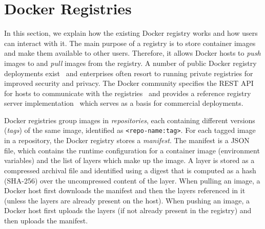 \section{Docker Registries}
\label{sec:background}


%
%

In this section, we explain how the existing Docker registry works and how users
can interact with it.
%
The main purpose of a registry is to store container images and make them available
to other users.
%
Therefore, it allows Docker hosts to \emph{push} images to and \emph{pull}
images from the registry.
%
A number of public Docker registry deployments
exist~\cite{docker-hub,amazon-ecr,jfrog-artifactory,azure-cr,google-cr} and
enterprises often resort to running private registries for improved security
and privacy.
%
The Docker community specifies the REST API for hosts to communicate with the
registries~\cite{docker-registry-api} and provides a reference registry server implementation~\cite{docker-registry-software} which serves as
a basis for commercial deployments.





Docker registries group images in \emph{repositories}, each containing
different versions (\emph{tags}) of the same image, identified as
\texttt{<repo-name:tag>}.
%
For each tagged image in a repository, the Docker registry stores a \emph{manifest}.
%
The manifest is a JSON file, which contains the runtime configuration for a
container image (\eg environment variables) and the list of layers which make
up the image.
%
A layer is stored as a compressed archival file and identified using a digest that is computed as a hash (SHA-256) over
the uncompressed content of the layer.
%
When pulling an image, a Docker host first downloads the manifest and then the
layers referenced in it (unless the layers are already present on the host).
%
When pushing an image, a Docker host first uploads the layers (if not already present in
the registry) and then uploads the manifest.





